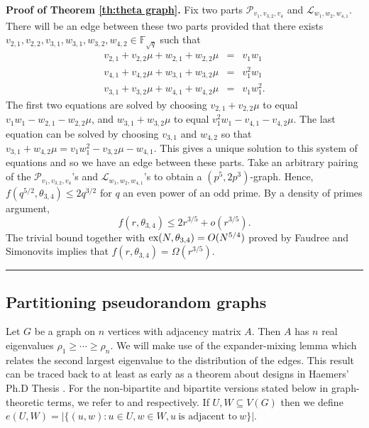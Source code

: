 \documentclass[12pt]{article}%
\newenvironment{proof}[1][Proof]{\noindent\textbf{#1.} }
{\hfill \ \rule{0.5em}{0.5em}}
\begin{document}
\begin{proof}[Proof of Theorem \ref{th:theta graph}]
Fix two parts $\mathcal{P}_{ v_1 , v_{3,2} ,v_4 }$ and
$\mathcal{L}_{ w_1 , w_2 , w_{4,1} }$.  There will be an edge between these two 
parts provided that there exists 
$v_{2,1} , v_{2,2} , v_{3,1}, w_{3,1}, w_{3,2}, w_{4,2} \in \mathbb{F}_{ \sqrt{q}}$ such that 
\begin{eqnarray*}
	v_{2,1} + v_{2,2} \mu + w_{2,1} + w_{2,2} \mu &  = & v_1 w_1 \\
	v_{4,1} + v_{4,2} \mu + w_{3,1} + w_{3,2} \mu & = & v_1^2 w_1 \\
	v_{3,1} + v_{3,2} \mu + w_{4,1} + w_{4,2} \mu  & = & v_1 w_1^2.
\end{eqnarray*}
The first two equations are solved by choosing $v_{2,1} + v_{2,2} \mu$ to 
equal $v_1 w_1 - w_{2,1} - w_{2,2} \mu$, 
and $w_{3,1} + w_{3,2} \mu$ to equal $ v_1^2 w_1 - v_{4,1} - v_{4,2} \mu$.
The last equation can be solved by 
choosing $v_{3,1}$ and $w_{4,2}$ so that 
$v_{3,1}+ w_{4,2} \mu = v_1 w_1^2 - v_{3,2} \mu - w_{4,1}$.
This gives a unique solution to this system of equations and so we have 
an edge between these parts.  
Take an arbitrary pairing of the $\mathcal{P}_{ v_1 , v_{3,2} ,v_4 }$'s
	and $\mathcal{L}_{w_1 , w_2 , w_{4,1} }$'s to obtain a $(p^5,2p^3)$-graph.  Hence, 
 $f( q^{5/2} , \theta_{3,4} ) \leq 2q^{3/2}$ for $q$ an even power of an odd prime.  By a density of 
 primes argument, 
 \[
 f( r , \theta_{3,4} ) \leq 2 r^{3/5} + o ( r^{3/5} ).
 \]
The trivial bound together with 
$\textup{ex}( N, \theta_{3,4} ) = O(N^{5/4})$ proved by Faudree and Simonovits \cite{FS} implies that $f(r, \theta_{3,4}) = \Omega( r^{3/5})$.
 \end{proof}



\subsection{Partitioning pseudorandom graphs} \label{Section pseudorandom}

 Let $G$ be a graph on $n$ vertices with adjacency matrix $A$. Then $A$ has $n$ real eigenvalues $\rho_1\ge\cdots\ge\rho_n$.  We will make use of the expander-mixing lemma which relates the second largest eigenvalue to the distribution of the edges. This result can be traced back to at least as early as a theorem about designs in Haemers' Ph.D Thesis \cite{Haemers}. For the non-bipartite and bipartite versions stated below in graph-theoretic terms, we refer to \cite{ac} and \cite{De-Winter} respectively. If $U,W\subseteq V(G)$ then we define
 $e(U,W)=|\{(u,w):u\in U,w\in W,u ~\mbox{is adjacent to}~ w\}|$.
 
\end{document}
